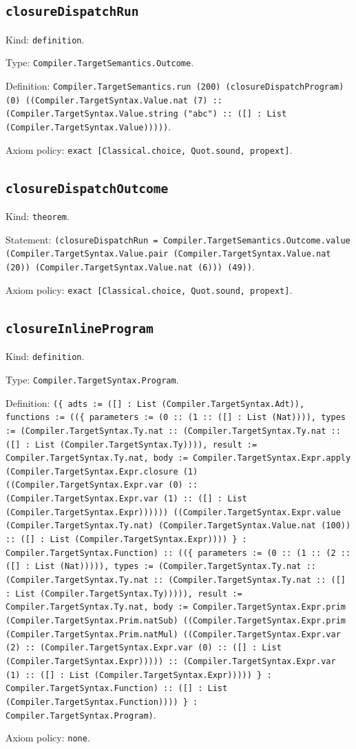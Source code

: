 \documentclass[11pt]{article}
\begin{document}
\subsection*{\texttt{closureDispatchRun}}
\noindent Kind: \texttt{definition}.\par
\noindent Type: \texttt{Compiler.TargetSemantics.Outcome}.\par
\noindent Definition: \texttt{Compiler.TargetSemantics.run (200) (closureDispatchProgram) (0) ((Compiler.TargetSyntax.Value.nat (7) :: (Compiler.TargetSyntax.Value.string ("abc") :: ([] : List (Compiler.TargetSyntax.Value)))))}.\par
\noindent Axiom policy: \texttt{exact [Classical.choice, Quot.sound, propext]}.\par
\subsection*{\texttt{closureDispatchOutcome}}
\noindent Kind: \texttt{theorem}.\par
\noindent Statement: \texttt{(closureDispatchRun = Compiler.TargetSemantics.Outcome.value (Compiler.TargetSyntax.Value.pair (Compiler.TargetSyntax.Value.nat (20)) (Compiler.TargetSyntax.Value.nat (6))) (49))}.\par
\noindent Axiom policy: \texttt{exact [Classical.choice, Quot.sound, propext]}.\par
\subsection*{\texttt{closureInlineProgram}}
\noindent Kind: \texttt{definition}.\par
\noindent Type: \texttt{Compiler.TargetSyntax.Program}.\par
\noindent Definition: \texttt{(\{ adts := ([] : List (Compiler.TargetSyntax.Adt)), functions := ((\{ parameters := (0 :: (1 :: ([] : List (Nat)))), types := (Compiler.TargetSyntax.Ty.nat :: (Compiler.TargetSyntax.Ty.nat :: ([] : List (Compiler.TargetSyntax.Ty)))), result := Compiler.TargetSyntax.Ty.nat, body := Compiler.TargetSyntax.Expr.apply (Compiler.TargetSyntax.Expr.closure (1) ((Compiler.TargetSyntax.Expr.var (0) :: (Compiler.TargetSyntax.Expr.var (1) :: ([] : List (Compiler.TargetSyntax.Expr)))))) ((Compiler.TargetSyntax.Expr.value (Compiler.TargetSyntax.Ty.nat) (Compiler.TargetSyntax.Value.nat (100)) :: ([] : List (Compiler.TargetSyntax.Expr)))) \} : Compiler.TargetSyntax.Function) :: ((\{ parameters := (0 :: (1 :: (2 :: ([] : List (Nat))))), types := (Compiler.TargetSyntax.Ty.nat :: (Compiler.TargetSyntax.Ty.nat :: (Compiler.TargetSyntax.Ty.nat :: ([] : List (Compiler.TargetSyntax.Ty))))), result := Compiler.TargetSyntax.Ty.nat, body := Compiler.TargetSyntax.Expr.prim (Compiler.TargetSyntax.Prim.natSub) ((Compiler.TargetSyntax.Expr.prim (Compiler.TargetSyntax.Prim.natMul) ((Compiler.TargetSyntax.Expr.var (2) :: (Compiler.TargetSyntax.Expr.var (0) :: ([] : List (Compiler.TargetSyntax.Expr))))) :: (Compiler.TargetSyntax.Expr.var (1) :: ([] : List (Compiler.TargetSyntax.Expr))))) \} : Compiler.TargetSyntax.Function) :: ([] : List (Compiler.TargetSyntax.Function)))) \} : Compiler.TargetSyntax.Program)}.\par
\noindent Axiom policy: \texttt{none}.\par
\end{document}
